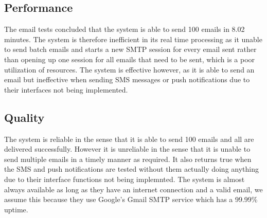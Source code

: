 \documentclass[11pt]{article}
\begin{document}
	\subsection{Performance}
    The email tests concluded that the system is able to send 100 emails in 8.02 minutes.
    The system is therefore inefficient in its real time processing as it unable to send batch emails and starts a new SMTP session for every email sent rather than opening up one session for all emails that need to be sent, which is a poor utilization of resources. The system is effective however, as it is able to send an email but ineffective when sending SMS messages or push notifications due to their interfaces not being implemented.
    
    \subsection{Quality}
    The system is reliable in the sense that it is able to send 100 emails and all are delivered successfully. However it is unreliable in the sense that it is unable to send multiple emails in a timely manner as required. It also returns true when the SMS and push notifications are tested without them actually doing anything due to their interface functions not being implemnted. The system is almost always available as long as they have an internet connection and a valid email, we assume this because they use Google's Gmail SMTP service which has a 99.99\% uptime.
    
\end{document}
